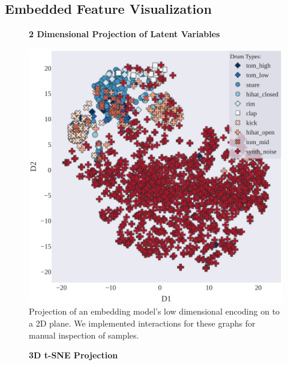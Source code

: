 \documentclass[runningheads,a4paper]{llncs}
\begin{document}
\begin{appendices}
\chapter{Embedded Feature Visualization}
\label{appendix:E}
\begin{figure}[]
\centering
\textbf{2 Dimensional Projection of Latent Variables}\par\medskip
 \includegraphics[width=0.90\linewidth]{images/t-SNE_2d.pdf}
\caption{Projection of an embedding model's low dimensional encoding on to a 2D plane. We implemented interactions for these graphs for manual inspection of samples. }
\label{fig:2d_tsne}
\end{figure}

\begin{figure}[]
\centering
\textbf{3D t-SNE Projection}\par\medskip
\mbox{}


\end{figure}
\end{appendices}
\end{document}

